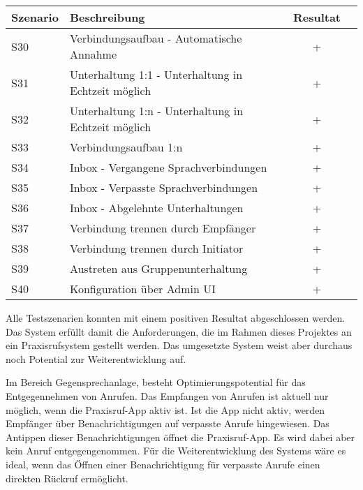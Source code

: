 \begin{table}[h]
    \centering
    \begin{tabular}{|l|p{11cm}|c|c|}
        \hline
        \textbf{Szenario} & \textbf{Beschreibung} & \textbf{Resultat} \\
        \hline
        S30         & Verbindungsaufbau - Automatische Annahme & +\\
        \hline
        S31         & Unterhaltung 1:1 - Unterhaltung in Echtzeit möglich & +\\
        \hline
        S32         & Unterhaltung 1:n - Unterhaltung in Echtzeit möglich & +\\
        \hline
        S33         & Verbindungsaufbau 1:n & +\\
        \hline
        S34         & Inbox - Vergangene Sprachverbindungen & +\\
        \hline
        S35         & Inbox - Verpasste Sprachverbindungen & +\\
        \hline
        S36         & Inbox - Abgelehnte Unterhaltungen & +\\
        \hline
        S37         & Verbindung trennen durch Empfänger & +\\
        \hline
        S38         & Verbindung trennen durch Initiator & +\\
        \hline
        S39         & Austreten aus Gruppenunterhaltung & +\\
        \hline
        S40         & Konfiguration über Admin UI & +\\
        \hline
    \end{tabular}\label{tab:funktion_testplan_2}
\end{table}

Alle Testszenarien konnten mit einem positiven Resultat abgeschlossen werden.
Das System erfüllt damit die Anforderungen, die im Rahmen dieses Projektes an ein Praxisrufsystem gestellt werden.
Das umgesetzte System weist aber durchaus noch Potential zur Weiterentwicklung auf.

Im Bereich Gegensprechanlage, besteht Optimierungspotential für das Entgegennehmen von Anrufen.
Das Empfangen von Anrufen ist aktuell nur möglich, wenn die Praxisruf-App aktiv ist.
Ist die App nicht aktiv, werden Empfänger über Benachrichtigungen auf verpasste Anrufe hingewiesen.
Das Antippen dieser Benachrichtigungen öffnet die Praxisruf-App.
Es wird dabei aber kein Anruf entgegengenommen.
Für die Weiterentwicklung des Systems wäre es ideal, wenn das Öffnen einer Benachrichtigung für verpasste Anrufe einen direkten Rückruf ermöglicht.

